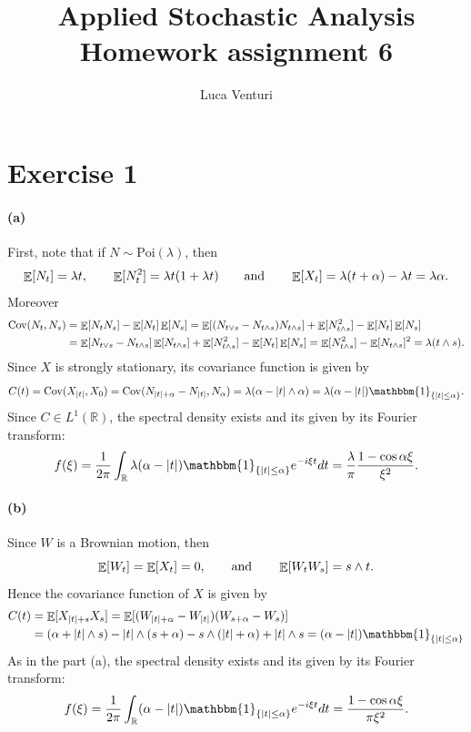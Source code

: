 \documentclass[a4paper,11pt]{article}
\theoremstyle{definition}
\theoremstyle{plain}
\theoremstyle{remark}
\DeclarePairedDelimiter{\abs}{\lvert}{\rvert}
\DeclarePairedDelimiter{\parq}{[}{]}
\DeclarePairedDelimiter{\bra}{\lbrace}{\rbrace}
\DeclareMathOperator*{\expval}{\mathbb{E}}
\DeclareMathOperator*{\covval}{\mathrm{Cov}}
\begin{document}
\title{Applied Stochastic Analysis \\ Homework assignment 6}
\author{Luca Venturi}
\maketitle

\section*{Exercise 1}

\paragraph*{(a)}

First, note that if $N\sim \mathrm{Poi}(\lambda)$, then 
$$
\expval\parq{N_t} = \lambda t, \qquad \expval\parq{N_t^2} = \lambda t(1+\lambda t) \qquad \text{and} \qquad \expval\parq{X_t} = \lambda (t+\alpha) - \lambda t = \lambda \alpha.
$$
Moreover
\begin{align*}
\covval(N_t,N_s) & = \expval\parq{N_tN_s} - \expval\parq{N_t}\expval\parq{N_s} = \expval\parq{(N_{t\vee s}-N_{t\wedge s})N_{t\wedge s}} + \expval\parq{N_{t\wedge s}^2} - \expval\parq{N_t}\expval\parq{N_s} \\ & = \expval\parq{N_{t\vee s}-N_{t\wedge s}}\expval\parq{N_{t\wedge s}} + \expval\parq{N_{t\wedge s}^2} - \expval\parq{N_t}\expval\parq{N_s} = \expval\parq{N_{t\wedge s}^2} -\expval\parq{N_{t\wedge s}}^2 = \lambda ({t\wedge s}).
\end{align*}
Since $X$ is strongly stationary, its covariance function is given by
$$
C(t) = \covval(X_{\abs{t}},X_0) = \covval(N_{\abs{t}+\alpha}-N_{\abs{t}},N_\alpha) = \lambda(\alpha-\abs{t}\wedge\alpha) = \lambda(\alpha-\abs{t})\mathbbm{1}_{\bra{\abs{t}\leq\alpha}}.
$$
Since $C\in L^1(\mathbb{R})$, the spectral density exists and its given by its Fourier transform:
$$
f(\xi) = \frac{1}{2\pi}\int_\mathbb{R} \lambda(\alpha-\abs{t})\mathbbm{1}_{\bra{\abs{t}\leq\alpha}}e^{-i\xi t}dt = \frac{\lambda}{\pi} \frac{1-\cos \alpha\xi}{\xi^2}.
$$

\paragraph*{(b)}

Since $W$ is a Brownian motion, then 
$$
\expval\parq{W_t} = \expval\parq{X_t} = 0, \qquad \text{and} \qquad \expval\parq{W_tW_s} =  s\wedge t.
$$
Hence the covariance function of $X$ is given by
\begin{align*}
C(t) & = \expval\parq{X_{\abs{t}+s}X_s} = \expval\parq{(W_{\abs{t}+\alpha}-W_{\abs{t}})(W_{s+\alpha}-W_s)} \\ & = (\alpha + \abs{t}\wedge s) - \abs{t}\wedge(s+\alpha) - s\wedge(\abs{t}+\alpha) + \abs{t}\wedge s = (\alpha-\abs{t})\mathbbm{1}_{\bra{\abs{t}\leq\alpha}}
\end{align*}
As in the part (a), the spectral density exists and its given by its Fourier transform:
$$
f(\xi) = \frac{1}{2\pi}\int_\mathbb{R} (\alpha-\abs{t})\mathbbm{1}_{\bra{\abs{t}\leq\alpha}}e^{-i\xi t}dt = \frac{1-\cos \alpha\xi}{\pi\xi^2}.
$$
\end{document}
